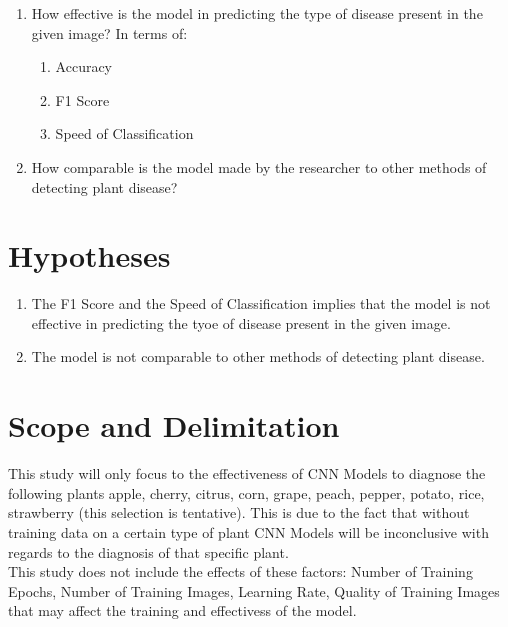     \begin{enumerate}
    \item How effective is the model in predicting the
    type of disease present in the given image? 
    In terms of:

        \begin{enumerate}
            \item Accuracy
            \item F1 Score 
            \item Speed of Classification 
        \end{enumerate}

    \item How comparable is the model made by the researcher 
    to other methods of detecting plant disease? 
    \end{enumerate}

\section{Hypotheses}
    \begin{enumerate}
        \item The F1 Score and the Speed of Classification implies that
              the model is not effective in predicting the tyoe of disease 
              present in the given image.
        \item The model is not comparable to other methods of detecting plant
              disease.
    \end{enumerate}

\section{Scope and Delimitation}
This study will only focus to the effectiveness of 
CNN Models to diagnose the following plants 
apple, cherry, citrus, corn, grape, peach, pepper,
potato, rice, strawberry (this selection is tentative). 
This is due to the fact that without training data on a 
certain type of plant CNN Models will be inconclusive with 
regards to the diagnosis of that specific plant. \\

This study does not include the effects of these factors: Number of Training Epochs, 
Number of Training Images, Learning Rate, Quality of Training Images 
that may affect the training and effectivess of the model. 

